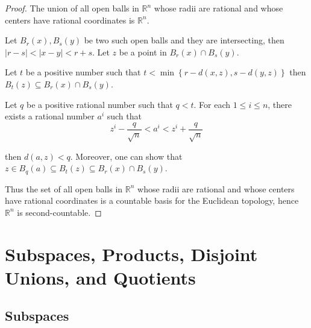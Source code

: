 \begin{proof}
    The union of all open balls in \( \mathbb{R}^{n} \) whose radii are rational and whose centers have rational coordinates is \( \mathbb{R}^{n} \).

    Let \( B_{r}(x), B_{s}(y) \) be two such open balls and they are intersecting, then \( \left\vert r - s \right\vert < \left\vert x - y \right\vert < r + s \). Let \( z \) be a point in \( B_{r}(x) \cap B_{s}(y) \).

    Let \( t \) be a positive number such that \( t < \min\left\{ r - d(x,z), s - d(y, z) \right\} \) then \( B_{t}(z) \subseteq B_{r}(x) \cap B_{s}(y) \).

    Let \( q \) be a positive rational number such that \( q < t \). For each \( 1 \le i \le n \), there exists a rational number \( a^{i} \) such that
    \[
        z^{i} - \dfrac{q}{\sqrt{n}} < a^{i} < z^{i} + \dfrac{q}{\sqrt{n}}
    \]

    then \( d(a, z) < q \). Moreover, one can show that \( z \in B_{q}(a) \subseteq B_{t}(z) \subseteq B_{r}(x) \cap B_{s}(y) \).

    Thus the set of all open balls in \( \mathbb{R}^{n} \) whose radii are rational and whose centers have rational coordinates is a countable basis for the Euclidean topology, hence \( \mathbb{R}^{n} \) is second-countable.
\end{proof}

\section{Subspaces, Products, Disjoint Unions, and Quotients}

\subsection{Subspaces}

